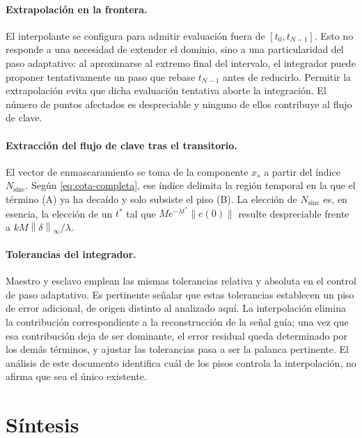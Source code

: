 \documentclass[12pt,a4paper]{article}
\newcommand{\dnorm}[1]{\left\lVert #1 \right\rVert}
\newcommand{\infnorm}[1]{\dnorm{#1}_{\infty}}
\begin{document}
\paragraph{Extrapolación en la frontera.}
El interpolante se configura para admitir evaluación fuera de $[t_0,t_{N-1}]$. Esto
no responde a una necesidad de extender el dominio, sino a una particularidad del
paso adaptativo: al aproximarse al extremo final del intervalo, el integrador puede
proponer tentativamente un paso que rebase $t_{N-1}$ antes de reducirlo. Permitir
la extrapolación evita que dicha evaluación tentativa aborte la integración. El
número de puntos afectados es despreciable y ninguno de ellos contribuye al flujo
de clave.

\paragraph{Extracción del flujo de clave tras el transitorio.}
El vector de enmascaramiento se toma de la componente $x_s$ a partir del índice
$N_{\mathrm{sinc}}$. Según \eqref{eq:cota-completa}, ese índice delimita la región
temporal en la que el término (A) ya ha decaído y solo subsiste el piso (B). La
elección de $N_{\mathrm{sinc}}$ es, en esencia, la elección de un $t^{*}$ tal que
$M e^{-\lambda t^{*}}\dnorm{e(0)}$ resulte despreciable frente a
$k M \infnorm{\delta}/\lambda$.

\paragraph{Tolerancias del integrador.}
Maestro y esclavo emplean las mismas tolerancias relativa y absoluta en el control
de paso adaptativo. Es pertinente señalar que estas tolerancias establecen un piso
de error adicional, de origen distinto al analizado aquí. La interpolación elimina
la contribución correspondiente a la reconstrucción de la señal guía; una vez que
esa contribución deja de ser dominante, el error residual queda determinado por los
demás términos, y ajustar las tolerancias pasa a ser la palanca pertinente. El
análisis de este documento identifica cuál de los pisos controla la interpolación,
no afirma que sea el único existente.

\section{Síntesis}
\end{document}

